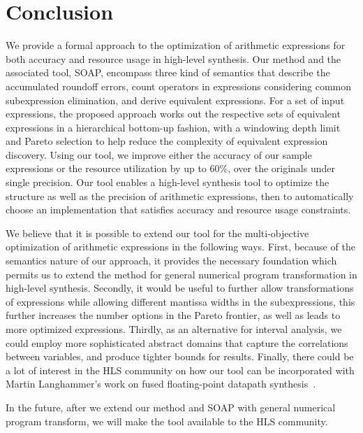 \section{Conclusion}
\label{sec:conclusion}

We provide a formal approach to the optimization of arithmetic expressions
for both accuracy and resource usage in high-level synthesis. Our method and
the associated tool, SOAP, encompass three kind of semantics that describe
the accumulated roundoff errors, count operators in expressions considering
common subexpression elimination, and derive equivalent expressions. For a
set of input expressions, the proposed approach works out the respective
sets of equivalent expressions in a hierarchical bottom-up fashion, with a
windowing depth limit and Pareto selection to help reduce the complexity of
equivalent expression discovery. Using our tool, we improve either the accuracy
of our sample expressions or the resource utilization by up to 60\%, over the
originals under single precision. Our tool enables a high-level synthesis tool
to optimize the structure as well as the precision of arithmetic expressions,
then to automatically choose an implementation that satisfies accuracy and
resource usage constraints.

We believe that it is possible to extend our tool for the multi-objective
optimization of arithmetic expressions in the following ways. First,
because of the semantics nature of our approach, it provides the necessary
foundation which permits us to extend the method for general numerical program
transformation in high-level synthesis. Secondly, it would be useful to further
allow transformations of expressions while allowing different mantissa widths
in the subexpressions, this further increases the number options in the Pareto
frontier, as well as leads to more optimized expressions. Thirdly, as an
alternative for interval analysis, we could employ more sophisticated abstract
domains that capture the correlations between variables, and produce tighter
bounds for results. Finally, there could be a lot of interest in the HLS
community on how our tool can be incorporated with Martin Langhammer's work on
fused floating-point datapath synthesis~\cite{langhammer}.

In the future, after we extend our method and SOAP with general numerical
program transform, we will make the tool available to the HLS community.
